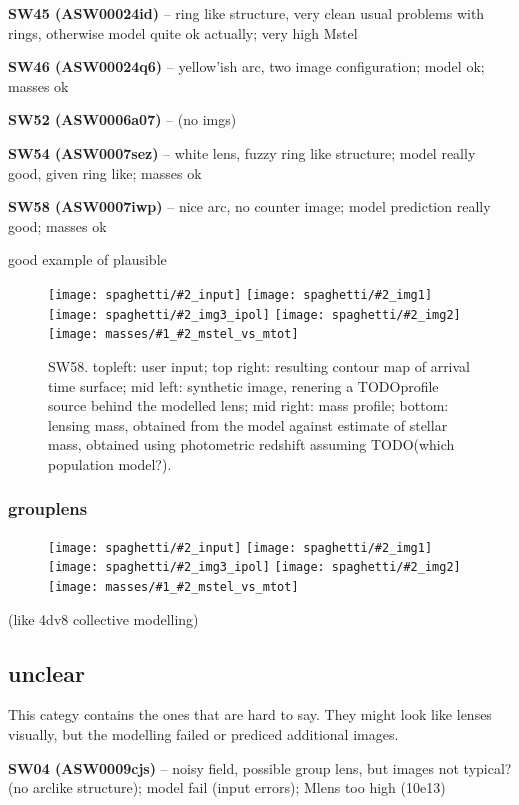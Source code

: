 \documentclass[fleqn,usenatbib]{mnras}
\newcommand{\inclfig}[2]{
  \centering
	\texttt{[image: spaghetti/\#2\_input]}%
	\texttt{[image: spaghetti/\#2\_img1]}
	\texttt{[image: spaghetti/\#2\_img3\_ipol]}%
	\texttt{[image: spaghetti/\#2\_img2]}
	\texttt{[image: masses/\#1\_\#2\_mstel\_vs\_mtot]}
}
\newcommand{\lenstitle}[1]{\noindent\textbf{#1} --}
\begin{document}
\lenstitle{SW45 (ASW00024id)}
  ring like structure, very clean
  usual problems with rings, otherwise model quite ok actually;
  very high Mstel
  
\lenstitle{SW46 (ASW00024q6)} 
  yellow'ish arc, two image configuration;
  model ok;
  masses ok
  
\lenstitle{SW52 (ASW0006a07)} 
  (no imgs)
  
\lenstitle{SW54 (ASW0007sez)} 
  white lens, fuzzy ring like structure;
  model really good, given ring like;
  masses ok
  
\lenstitle{SW58 (ASW0007iwp)} 
  nice arc, no counter image;
  model prediction really good;
  masses ok


good example of plausible


\begin{figure}
  \inclfig{SW58}{ASW0007iwp_4XBJWT3COV}
  \caption{SW58. topleft: user input; top right: resulting contour map of arrival time surface; mid left: synthetic image, renering a TODO{profile} source behind the modelled lens; mid right: mass profile; bottom: lensing mass, obtained from the model against estimate of stellar mass, obtained using photometric redshift assuming TODO(which population model?).}
  \label{fig:SW58}
\end{figure}


\subsubsection{grouplens}

\begin{figure}
  \inclfig{SW36}{ASW000096t_7IPP7LWVOF}
\end{figure}

(like 4dv8 collective modelling)




\subsection{unclear}

This categy contains the ones that are hard to say.
They might look like lenses visually, but the modelling failed or prediced additional images.



\lenstitle{SW04 (ASW0009cjs)} 
  noisy field, possible group lens, but images not typical? (no arclike structure);
  model fail (input errors);
  Mlens too high (10e13)
  
\end{document}
